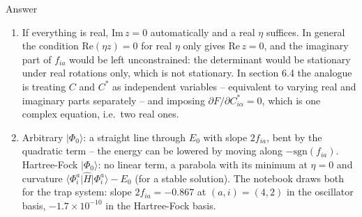 \documentclass[aspectratio=169,10pt]{beamer}
\newcounter{thinkctr}
\newcommand{\thinka}[1]{%
  \begin{tcolorbox}[colback=paleteal,colframe=teal,title={\bfseries Answer to pause \#\thethinkctr}]
  #1
  \end{tcolorbox}}
\newcommand{\ket}[1]{\vert #1\rangle}
\newcommand{\element}[3]{\langle #1\vert #2\vert #3\rangle}
\begin{document}
\begin{frame}{Answer}
  \thinka{
  \begin{enumerate}
    \item If everything is real, $\mathrm{Im}\,z=0$ automatically and a real $\eta$ suffices. In general the condition $\mathrm{Re}(\eta z)=0$ for real $\eta$ only gives $\mathrm{Re}\,z=0$, and the imaginary part of $f_{ia}$ would be left unconstrained: the determinant would be stationary under real rotations only, which is not stationary. In section 6.4 the analogue is treating $C$ and $C^{*}$ as independent variables -- equivalent to varying real and imaginary parts separately -- and imposing $\partial F/\partial C^{*}_{i\alpha}=0$, which is one complex equation, i.e.\ two real ones.
    \item Arbitrary $\ket{\Phi_0}$: a straight line through $E_0$ with slope $2f_{ia}$, bent by the quadratic term -- the energy can be lowered by moving along $-\mathrm{sgn}(f_{ia})$. Hartree-Fock $\ket{\Phi_0}$: no linear term, a parabola with its minimum at $\eta=0$ and curvature $\element{\Phi_i^a}{\hat{H}}{\Phi_i^a}-E_0$ (for a stable solution). The notebook draws both for the trap system: slope $2f_{ia}=-0.867$ at $(a,i)=(4,2)$ in the oscillator basis, $-1.7\times10^{-10}$ in the Hartree-Fock basis.
  \end{enumerate}}
\end{frame}
\end{document}
